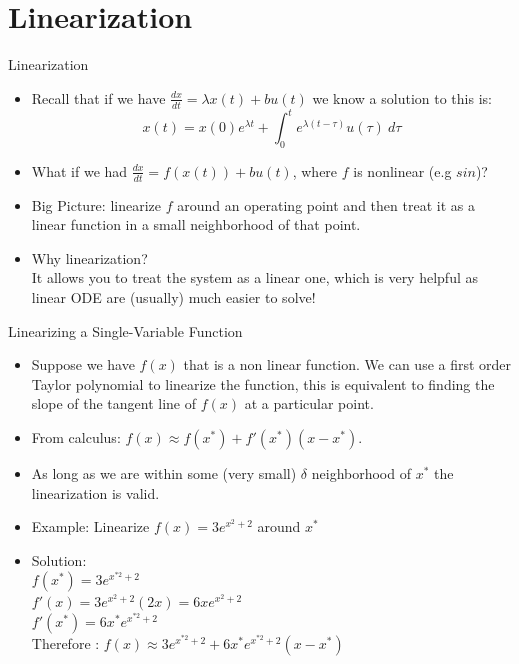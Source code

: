 \documentclass{beamer}
\begin{document}
\section{Linearization}

\begin{frame}{Linearization}
\begin{itemize}


\item Recall that if we have $\frac{dx}{dt} = \lambda x(t) + bu(t)$ we know a solution to this is: $$x(t) = x(0)e^{\lambda t} + \int_0^t \! e^{\lambda(t - \tau)}u(\tau)\ d\tau$$
\item What if we had $\frac{dx}{dt} = f(x(t)) + bu(t)$, where $f$ is nonlinear (e.g $sin$)? \pause \\
\item Big Picture: linearize $f$ around an operating point and then treat it as a linear function in a small neighborhood of that point.\\
\item Why linearization? \pause
\\ It allows you to treat the system as a linear one, which is very helpful as linear ODE are (usually) much easier to solve!
\end{itemize}
\end{frame}
\begin{frame}{Linearizing a Single-Variable Function}
\begin{itemize}
\item Suppose we have $f(x)$ that is a non linear function. We can use a first order Taylor polynomial to linearize the function, this is equivalent to finding the slope of the tangent line of $f(x)$ at a particular point.
\item From calculus: $f(x) \approx f(x^*) + f'(x^*)(x - x^*)$.
\item As long as we are within some (very small) $\delta$ neighborhood of $x^*$ the linearization is valid.
\item Example: Linearize $f(x) = 3e^{x^2 + 2}$ around $x^*$ 
\item Solution: \\
$f(x^*) = 3e^{x^{*2} + 2}$\\
$f'(x) = 3e^{x^2+2}(2x) = 6xe^{x^2+2}$\\
$f'(x^*) = 6x^*e^{x^{*2}+2}$\\
Therefore :
$f(x) \approx 3e^{x^{*2} + 2} +  6x^*e^{x^{*2}+2}(x-x^*) $
\end{itemize}

\end{frame}
\end{document}
